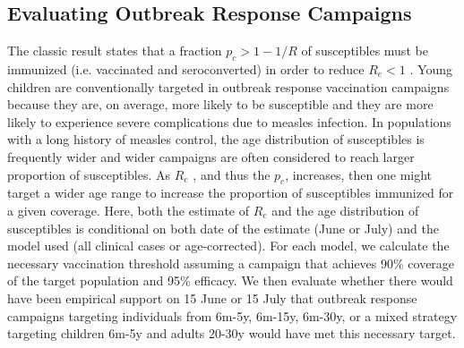 \subsection{Evaluating Outbreak Response Campaigns}\label{ori}

The classic result states that a fraction \(p_c \gt 1-1/R\) of susceptibles must be immunized
(i.e. vaccinated and seroconverted) in order to reduce
\(R_e \lt 1\) \cite{Anderson_1981}. Young
children are conventionally targeted in outbreak response vaccination
campaigns because they are, on average, more likely to be susceptible
and they are more likely to experience severe complications due to
measles infection. In populations with a long history of measles
control, the age distribution of susceptibles is frequently wider \cite{23798689} and wider campaigns are often
considered to reach larger proportion of susceptibles. As
\(R_e\) , and thus the \(p_c\),
increases, then one might target a wider age range to increase the
proportion of susceptibles immunized for a given coverage. Here, both
the estimate of \(R_e\) and the age distribution of
susceptibles is conditional on both date of the estimate (June or July)
and the model used (all clinical cases or age-corrected). For each
model, we calculate the necessary vaccination threshold assuming a
campaign that achieves 90\% coverage of the target population and 95\%
efficacy. We then evaluate whether there would have been empirical
support on 15 June or 15 July that outbreak response campaigns targeting
individuals from 6m-5y, 6m-15y, 6m-30y, or a mixed strategy targeting
children 6m-5y and adults 20-30y would have met this necessary target.